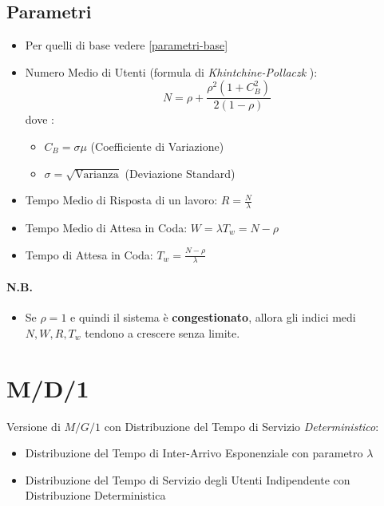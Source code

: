 \subsection{Parametri}

\begin{itemize}
    \item Per quelli di base vedere \ref{parametri-base}
    \item Numero Medio di Utenti (formula di \textit{Khintchine-Pollaczk} ): $$N
              = \rho + \frac{\rho^2 (1 + C^2_B)}{2 (1-\rho)}$$ dove :
          \begin{itemize}
              \item $C_B = \sigma \mu$ (Coefficiente di Variazione)
              \item $\sigma = \sqrt{\text{Varianza}}$ (Deviazione Standard)
          \end{itemize}
    \item Tempo Medio di Risposta di un lavoro: $R = \frac{N}{\lambda}$
    \item Tempo Medio di Attesa in Coda: $W = \lambda T_w = N - \rho$
    \item Tempo di Attesa in Coda: $T_w = \frac{N -\rho}{\lambda}$
\end{itemize}

\paragraph{N.B.}
\begin{itemize}
    \item Se $\rho = 1$ e quindi il sistema è \textbf{congestionato}, allora gli
          indici medi $N, W, R, T_w$ tendono a crescere senza limite.
\end{itemize}

\section{M/D/1}

Versione di $M/G/1$ con Distribuzione del Tempo di Servizio \textit{Deterministico}:

\begin{itemize}
    \item Distribuzione del Tempo di Inter-Arrivo Esponenziale con parametro
          $\lambda$
    \item Distribuzione del Tempo di Servizio degli Utenti Indipendente con
          Distribuzione Deterministica
\end{itemize}
